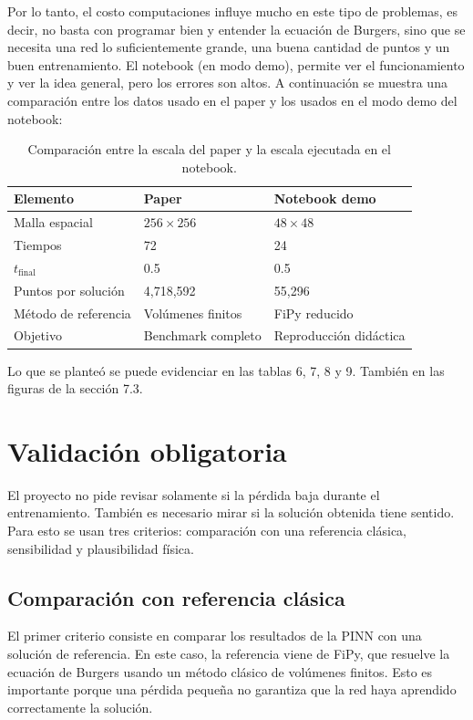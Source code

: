 \documentclass[10pt,letterpaper,twocolumn]{article}
\begin{document}
Por lo tanto, el costo computaciones influye mucho en este tipo de problemas, es decir, no basta con programar bien y entender la ecuación de Burgers, sino que se necesita una red lo suficientemente grande, una buena cantidad de puntos y un buen entrenamiento. El notebook (en modo demo), permite ver el funcionamiento y ver la idea general, pero los errores son altos. A continuación se muestra una comparación entre los datos usado en el paper y los usados en el modo demo del notebook:
\begin{table}[H]
\centering
\scriptsize
\setlength{\tabcolsep}{3pt}
\caption{Comparación entre la escala del paper y la escala ejecutada en el notebook.}
\begin{tabular}{lll}
\toprule
Elemento & Paper & Notebook demo \\
\midrule
Malla espacial & $256\times256$ & $48\times48$ \\
Tiempos & 72 & 24 \\
$t_{\mathrm{final}}$ & 0.5 & 0.5 \\
Puntos por solución & 4,718,592 & 55,296 \\
Método de referencia & Volúmenes finitos & FiPy reducido \\
Objetivo & Benchmark completo & Reproducción didáctica \\
\bottomrule
\end{tabular}
\label{tab:escala-paper-notebook}
\end{table}
Lo que se planteó se puede evidenciar en las tablas 6, 7, 8 y 9. También en las figuras de la sección 7.3.
\section{Validación obligatoria}

El proyecto no pide revisar solamente si la pérdida baja durante el entrenamiento. También es necesario mirar si la solución obtenida tiene sentido. Para esto se usan tres criterios: comparación con una referencia clásica, sensibilidad y plausibilidad física.

\subsection{Comparación con referencia clásica}

El primer criterio consiste en comparar los resultados de la PINN con una solución de referencia. En este caso, la referencia viene de FiPy, que resuelve la ecuación de Burgers usando un método clásico de volúmenes finitos. Esto es importante porque una pérdida pequeña no garantiza que la red haya aprendido correctamente la solución.\\
\end{document}
